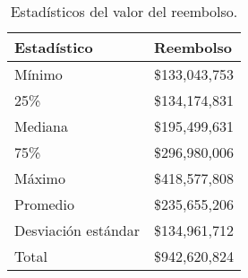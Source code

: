 \begin{table}[!htbp]
\centering
\caption{Estadísticos del valor del reembolso.} 
\label{tab:reembolso}
\begin{tabular}{ll}
  \hline
Estadístico & Reembolso \\ 
  \hline
Mínimo & \$133,043,753 \\ 
  25\% & \$134,174,831 \\ 
  Mediana & \$195,499,631 \\ 
  75\% & \$296,980,006 \\ 
  Máximo & \$418,577,808 \\ 
  Promedio & \$235,655,206 \\ 
  Desviación estándar & \$134,961,712 \\ 
  Total & \$942,620,824 \\ 
   \hline
\end{tabular}
\end{table}
